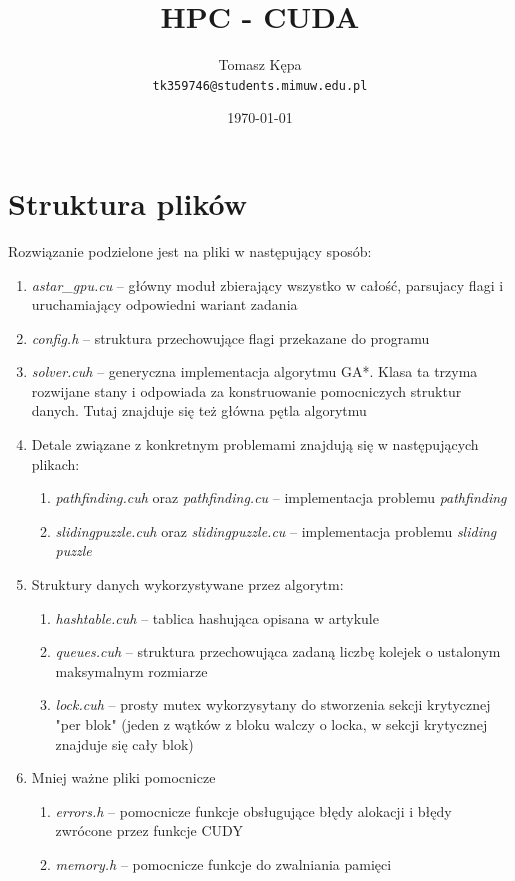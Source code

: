 \documentclass{article}
\date\today
\title{HPC - CUDA}
\author{Tomasz Kępa \\ \texttt{tk359746@students.mimuw.edu.pl}}
\begin{document}
\maketitle

\section{Struktura plików}
Rozwiązanie podzielone jest na pliki w następujący sposób:
\begin{enumerate}
  \item \emph{astar\_gpu.cu} -- główny moduł zbierający wszystko w całość, parsujacy flagi i uruchamiający odpowiedni wariant zadania
  \item \emph{config.h} -- struktura przechowujące flagi przekazane do programu
  \item \emph{solver.cuh} -- generyczna implementacja algorytmu GA*. 
  			Klasa ta trzyma rozwijane stany i odpowiada za konstruowanie pomocniczych struktur danych. 
  			Tutaj znajduje się też główna pętla algorytmu
  \item Detale związane z konkretnym problemami znajdują się w następujących plikach:
    \begin{enumerate}
      \item \emph{pathfinding.cuh} oraz \emph{pathfinding.cu} -- implementacja problemu \emph{pathfinding}
      \item \emph{slidingpuzzle.cuh} oraz \emph{slidingpuzzle.cu} -- implementacja problemu \emph{sliding puzzle}
    \end{enumerate}
  \item Struktury danych wykorzystywane przez algorytm:
    \begin{enumerate}
      \item \emph{hashtable.cuh} -- tablica hashująca opisana w artykule
      \item \emph{queues.cuh} -- struktura przechowująca zadaną liczbę kolejek o ustalonym maksymalnym rozmiarze
      \item \emph{lock.cuh} -- prosty mutex wykorzysytany do stworzenia sekcji krytycznej "per blok" 
                (jeden z wątków z bloku walczy o locka, w sekcji krytycznej znajduje się cały blok)
    \end{enumerate}
  \item Mniej ważne pliki pomocnicze
    \begin{enumerate}
      \item \emph{errors.h} -- pomocnicze funkcje obsługujące błędy alokacji i błędy zwrócone przez funkcje CUDY
      \item \emph{memory.h} -- pomocnicze funkcje do zwalniania pamięci
    \end{enumerate}
\end{enumerate}
\end{document}
